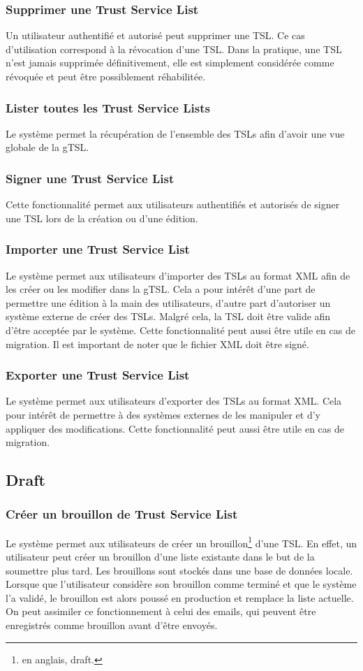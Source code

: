 \documentclass{tnreport}
\begin{document}
\subsubsection{Supprimer une Trust Service List}
Un utilisateur authentifié et autorisé peut supprimer une TSL. Ce cas d'utilisation correspond à la révocation d'une TSL. Dans la pratique, une TSL n'est jamais supprimée définitivement, elle est simplement considérée comme révoquée et peut être possiblement réhabilitée.
\subsubsection{Lister toutes les Trust Service Lists}
Le système permet la récupération de l'ensemble des TSLs afin d'avoir une vue globale de la gTSL.
\subsubsection{Signer une Trust Service List}
Cette fonctionnalité permet aux utilisateurs authentifiés et autorisés de signer une TSL lors de la création ou d'une édition.
\subsubsection{Importer une Trust Service List}
Le système permet aux utilisateurs d'importer des TSLs au format XML afin de les créer ou les modifier dans la gTSL. Cela a pour intérêt d'une part de permettre une édition à la main des utilisateurs, d'autre part d'autoriser un système externe de créer des TSLs. Malgré cela, la TSL doit être valide afin d'être acceptée par le système. Cette fonctionnalité peut aussi être utile en cas de migration. Il est important de noter que le fichier XML doit être signé.
\subsubsection{Exporter une Trust Service List}
Le système permet aux utilisateurs d'exporter des TSLs au format XML. Cela pour intérêt de permettre à des systèmes externes de les manipuler et d'y appliquer des modifications. Cette fonctionnalité peut aussi être utile en cas de migration.

\subsection{Draft}
\subsubsection{Créer un brouillon de Trust Service List}
Le système permet aux utilisateurs de créer un brouillon\footnote{en anglais, draft.} d'une TSL. En effet, un utilisateur peut créer un brouillon d'une liste existante dans le but de la soumettre plus tard. Les brouillons sont stockés dans une base de données locale. Lorsque que l'utilisateur considère son brouillon comme terminé et que le système l'a validé, le brouillon est alors poussé en production et remplace la liste actuelle. On peut assimiler ce fonctionnement à celui des emails, qui peuvent être enregistrés comme brouillon avant d'être envoyés.
\end{document}
